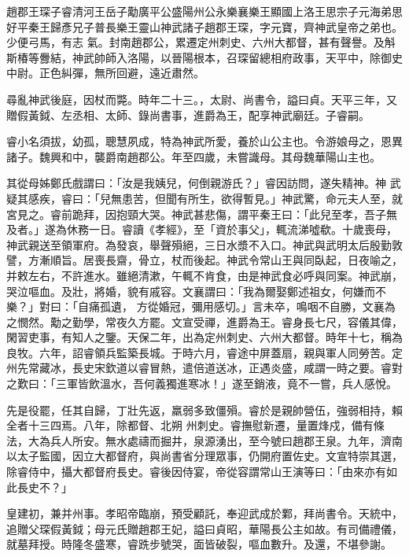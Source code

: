 
\begin{pinyinscope}

 趙郡王琛子睿清河王岳子勱廣平公盛陽州公永樂襄樂王顯國上洛王思宗子元海弟思好平秦王歸彥兄子普長樂王靈山神武諸子趙郡王琛，字元寶，齊神武皇帝之弟也。少便弓馬，有志
 氣。封南趙郡公，累遷定州刺史、六州大都督，甚有聲譽。及斛斯椿等釁結，神武帥師入洛陽，以晉陽根本，召琛留總相府政事，天平中，除御史中尉。正色糾彈，無所回避，遠近肅然。



 尋亂神武後庭，因杖而斃。時年二十三。，太尉、尚書令，謚曰貞。天平三年，又贈假黃鉞、左丞相、太師、錄尚書事，進爵為王，配享神武廟廷。子睿嗣。



 睿小名須拔，幼孤，聰慧夙成，特為神武所愛，養於山公主也。令游娘母之，恩異諸子。魏興和中，襲爵南趙郡公。年至四歲，未嘗識母。其母魏華陽山主也。



 其從母姊鄭氏戲謂曰：「汝是我姨兒，何倒親游氏？」睿因訪問，遂失精神。神
 武疑其感疾，睿曰：「兒無患苦，但聞有所生，欲得暫見。」神武驚，命元夫人至，就宮見之。睿前跪拜，因抱頸大哭。神武甚悲傷，謂平秦王曰：「此兒至孝，吾子無及者。」遂為休務一日。睿讀《孝經》，至「資於事父」，輒流涕噓欷。十歲喪母，神武親送至領軍府。為發哀，舉聲殞絕，三日水漿不入口。神武與武明太后殷勤敦譬，方漸順旨。居喪長齋，骨立，杖而後起。神武令常山王與同臥起，日夜喻之，并敕左右，不許進水。雖絕清漱，午輒不肯食，由是神武食必呼與同案。神武崩，哭泣嘔血。及壯，將婚，貌有戚容。文襄謂曰：「我為爾娶鄭述祖女，何嫌而不樂？」對曰：「自痛孤遺，
 方從婚冠，彌用感切。」言未卒，鳴咽不自勝，文襄為之憫然。勱之勤學，常夜久方罷。文宣受禪，進爵為王。睿身長七尺，容儀其偉，閑習吏事，有知人之鑒。天保二年，出為定州刺史、六州大都督。時年十七，稱為良牧。六年，詔睿領兵監築長城。于時六月，睿途中屏蓋扇，親與軍人同勞苦。定州先常藏冰，長史宋欽道以睿冒熱，遣倍道送冰，正遇炎盛，咸謂一時之要。睿對之歎曰：「三軍皆飲溫水，吾何義獨進寒冰！」遂至銷液，竟不一嘗，兵人感悅。



 先是役罷，任其自歸，丁壯先返，羸弱多致僵殞。睿於是親帥營伍，強弱相持，賴全者十三四焉。八年，除都督、北朔
 州刺史。睿撫慰新遷，量置烽戍，備有條法，大為兵人所安。無水處禱而掘井，泉源湧出，至今號曰趙郡王泉。九年，濟南以太子監國，因立大都督府，與尚書省分理眾事，仍開府置佐史。文宣特崇其選，除睿侍中，攝大都督府長史。睿後因侍宴，帝從容謂常山王演等曰：「由來亦有如此長史不？」



 皇建初，兼并州事。孝昭帝臨崩，預受顧託，奉迎武成於鄴，拜尚書令。天統中，追贈父琛假黃鉞；母元氏贈趙郡王妃，謚曰貞昭，華陽長公主如故。有司備禮儀，就墓拜授。時隆冬盛寒，睿跣步號哭，面皆破裂，嘔血數升。及還，不堪參謝。




\end{pinyinscope}
